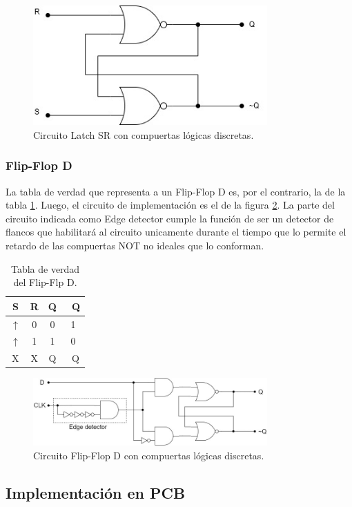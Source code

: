 \begin{figure}[H]
    \centering
    \includegraphics[width=0.8\textwidth]{../EJ6/Recursos/latch_sr_with_gates}
    \caption{Circuito Latch SR con compuertas lógicas discretas.}
    \label{fig:latch_sr_with_gates_ex6}
\end{figure}


\subsubsection{Flip-Flop D}
La tabla de verdad que representa a un Flip-Flop D es, por el contrario, la de la tabla \ref{table:ffd_truth_table_ex6}.
Luego, el circuito de implementación es el de la figura \ref{fig:ffd_with_gates_ex6}.
La parte del circuito indicada como Edge detector cumple la función de ser un detector de flancos que habilitará al circuito unicamente durante el tiempo que lo permite 
el retardo de las compuertas NOT no ideales que lo conforman.

\begin{table}[H]
    \centering
    \begin{tabular}{cc|cc}
    \textbf{S}   & \textbf{R} & \textbf{Q} & \textbf{~Q} \\ \hline
    $\uparrow$   & 0          & 0          & 1           \\
    $\uparrow$   & 1          & 1          & 0           \\
    X            & X          & Q          & ~Q         
    \end{tabular}
    \caption{Tabla de verdad del Flip-Flp D.}
    \label{table:ffd_truth_table_ex6}
\end{table}

\begin{figure}[H]
    \centering
    \includegraphics[width=0.8\textwidth]{../EJ6/Recursos/ffd_with_gates}
    \caption{Circuito Flip-Flop D con compuertas lógicas discretas.}
    \label{fig:ffd_with_gates_ex6}
\end{figure}



\subsection{Implementación en PCB}
